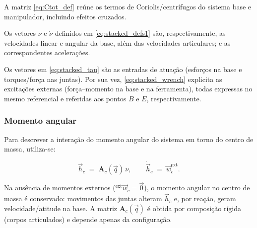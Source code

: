 A matriz \eqref{eq:Ctot_def} reúne os termos de Coriolis/centrífugos do sistema base e manipulador, incluindo efeitos cruzados.

Os vetores $\nu$ e $\dot{\nu}$ definidos em \eqref{eq:stacked_defs1} são, respectivamente, as velocidades linear e angular da base, além das velocidades articulares; e as correspondentes acelerações.

Os vetores em \eqref{eq:stacked_tau} são as entradas de atuação (esforços na base e torques/força nas juntas).
Por sua vez, \eqref{eq:stacked_wrench} explicita as excitações externas (força--momento na base e na ferramenta), todas expressas no mesmo referencial e referidas aos pontos $B$ e $E$, respectivamente.

\subsubsection{Momento angular}
Para descrever a interação do momento angular do sistema em torno do centro de massa, utiliza-se:

\begin{equation}
\label{eq:centroidal}
\vec h_{c}
\;=\;
\mathbf A_{c}(\vec q)\,\nu,
\qquad
\dot{\vec h}_{c} \;=\; \vec w^{\text{ext}}_{c}.
\end{equation}

Na ausência de momentos externos
(${}^{\text{ext}}\vec w_{c}=\vec 0$),
o momento angular no centro de massa é conservado: movimentos das juntas alteram $\vec h_{c}$ e, por reação, geram velocidade/atitude na base.
A matriz $\mathbf A_{c}(\vec q)$ é obtida por composição rígida (corpos articulados) e depende apenas da configuração.